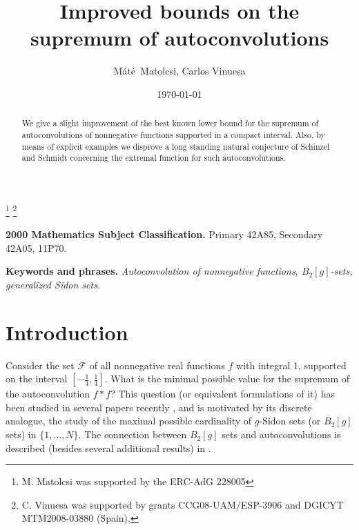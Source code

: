 \documentclass[12pt]{amsart}
\theoremstyle{definition}
\begin{document}
\title{Improved bounds on the supremum of autoconvolutions}
\author{M\'at\'e~Matolcsi, Carlos Vinuesa}
\address{M.M.: Alfr\'ed R\'enyi Institute of Mathematics, Realtanoda u 13-15, Budapest,
Hungary (also at BME Department of Analysis, Budapest,
H-1111, Egry J. u. 1).} 

\address{C.V.: Universidad Aut\'onoma de Madrid, Ciudad Universitaria de Cantoblanco, Madrid, Spain.}


\thanks{M. Matolcsi was supported by the ERC-AdG 228005}
\thanks{C. Vinuesa was supported by grants CCG08-UAM/ESP-3906 and DGICYT MTM2008-03880 (Spain).}

\date{\today}

\begin{abstract}
We give a slight improvement of the best known lower bound for the
supremum of autoconvolutions of nonnegative functions supported in
a compact interval. Also, by means of explicit examples we
disprove a long standing natural conjecture of Schinzel and
Schmidt concerning the extremal function for such
autoconvolutions.
\end{abstract}

\maketitle

{\bf 2000 Mathematics Subject Classification.} Primary 42A85,
Secondary 42A05, 11P70.

{\bf Keywords and phrases.} {\it Autoconvolution of nonnegative
functions, $B_2[g]$-sets, generalized Sidon sets.}


\section{Introduction}

Consider the set $\mathcal F$ of all nonnegative real functions
$f$ with integral 1, supported on the interval $[-\frac{1}{4},
\frac{1}{4}]$. What is the minimal possible value for the supremum
of the autoconvolution $f\ast f$? This question (or equivalent
formulations of it) has been studied in several papers recently
\cite{sch, martin1, yu, martin}, and is motivated by its discrete
analogue, the study of the maximal possible cardinality of
$g$-Sidon sets (or $B_2[g]$ sets) in $\{1,\dots, N\}$. The
connection between $B_2[g]$ sets and autoconvolutions is described
(besides several additional results) in \cite{martin1, regicarlos,
ujcarlos}.
\end{document}
